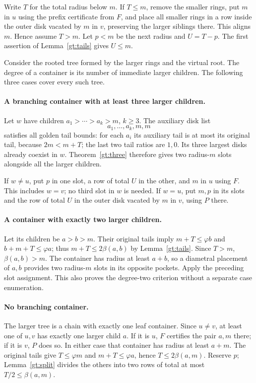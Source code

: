 \documentclass[11pt]{article}
\theoremstyle{definition}
\begin{document}
Write $T$ for the total radius below $m$. If $T\le m$, remove the
smaller rings, put $m$ in $u$ using the prefix certificate from $F$,
and place all smaller rings in a row inside the outer disk vacated
by $m$ in $v$, preserving the larger siblings there. This aligns $m$.
Hence assume $T>m$. Let $p<m$ be the next radius and $U=T-p$.
The first assertion of Lemma~\ref{gt:tails} gives $U\le m$.

Consider the rooted tree formed by the larger rings and the virtual
root. The degree of a container is its number of immediate larger
children. The following three cases cover every such tree.

\paragraph{A branching container with at least three larger children.}
Let $w$ have children $a_1>\cdots>a_k>m$, $k\ge3$. The auxiliary
disk list
\[
 a_1,\ldots,a_k,m,m
\]
satisfies all golden tail bounds: for each $a_i$ its auxiliary tail
is at most its original tail, because $2m<m+T$; the last two tail
ratios are $1,0$. Its three largest disks already coexist in $w$.
Theorem~\ref{gt:three} therefore gives two radius-$m$ slots alongside
all the larger children.

If $w\ne u$, put $p$ in one slot, a row of total $U$ in the other,
and $m$ in $u$ using $F$. This includes $w=v$; no third slot in $w$
is needed. If $w=u$, put $m,p$ in its slots and the row of total $U$
in the outer disk vacated by $m$ in $v$, using $P$ there.

\paragraph{A container with exactly two larger children.}
Let its children be $a>b>m$. Their original tails imply
$m+T\le\varphi b$ and $b+m+T\le\varphi a$; thus
$m+T\le2\beta(a,b)$ by Lemma~\ref{gt:tails}. Since $T>m$,
$\beta(a,b)>m$. The container has radius at least $a+b$, so a diametral
placement of $a,b$ provides two radius-$m$ slots in its opposite pockets.
Apply the preceding slot assignment. This also proves the degree-two
criterion without a separate case enumeration.

\paragraph{No branching container.}
The larger tree is a chain with exactly one leaf container. Since
$u\ne v$, at least one of $u,v$ has exactly one larger child $a$.
If it is $u$, $F$ certifies the pair $a,m$ there; if it is $v$, $P$
does so. In either case that container has radius at least $a+m$.
The original tails give $T\le\varphi m$ and $m+T\le\varphi a$, hence
$T\le2\beta(a,m)$. Reserve $p$; Lemma~\ref{gt:split} divides
the others into two rows of total at most $T/2\le\beta(a,m)$.
\end{document}
